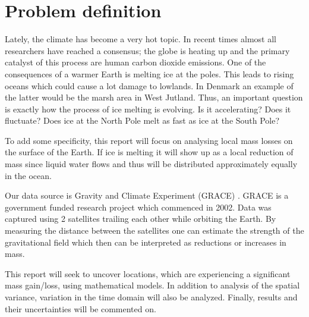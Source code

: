 \section{Problem definition}
Lately, the climate has become a very hot topic. 
In recent times almost all researchers have reached a consensus;
the globe is heating up and the primary catalyst of this process are human carbon dioxide emissions.
One of the consequences of a warmer Earth is melting ice at the poles.
This leads to rising oceans which could cause a lot damage to lowlands.
In Denmark an example of the latter would be the marsh area in West Jutland.
Thus, an important question is exactly how the process of ice melting is evolving. 
Is it accelerating? Does it fluctuate? Does ice at the North Pole melt as fast as ice at the South Pole?

To add some specificity, this report will focus on analysing local mass losses on the surface of the Earth.
If ice is melting it will show up as a local reduction of mass since liquid water flows and thus will be distributed approximately equally in the ocean. 

Our data source is Gravity and Climate Experiment (GRACE) \cite{GRACE-data-source}. 
GRACE is a government funded research project which commenced in 2002. Data was captured using 2 satellites trailing each other while orbiting the Earth.
By measuring the distance between the satellites one can estimate the strength of the gravitational field which then can be interpreted as reductions or increases in mass.

This report will seek to uncover locations, which are experiencing a significant mass gain/loss, using mathematical models. 
In addition to analysis of the spatial variance, variation in the time domain will also be analyzed.
Finally, results and their uncertainties will be commented on.
